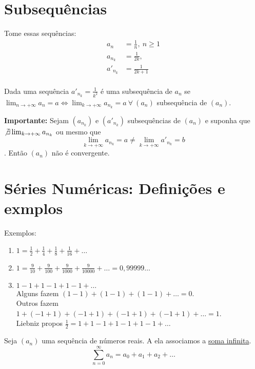 \documentclass[12pt,openany, letterpaper]{book}
\begin{document}
\section{Subsequências}
\label{sec:s24}
\hspace{5mm} Tome essas sequências:
\begin{align*}
a_n &= \frac{1}{n}, \ n \geq 1 \\
a_{n_k} &= \frac{1}{2k}, \\
a'_{n_k} &= \frac{1}{2k+1} \\
\end{align*}

Dada uma sequência $\displaystyle{a'_{n_k} = \frac{1}{k^2}}$ é uma subsequência de $a_n$ se $\displaystyle{\lim_{n \rightarrow +\infty} a_n = a \Longleftrightarrow \lim_{k \rightarrow +\infty} a_{n_k} = a} \ \forall \ (a_n)$ subsequência de $(a_n)$.

\textbf{Importante: }Sejam $(a_{n_k})$ e $(a'_{n_k})$ subsequências de $(a_n)$ e suponha que $\not \exists \lim_{k \rightarrow +\infty} a_{n_k}$ ou mesmo que $$\lim_{k \rightarrow +\infty} a_{n_k} = a \neq \lim_{k \rightarrow +\infty} a'_{n_k} = b $$. Então $(a_n)$ não é convergente.

\section{Séries Numéricas: Definições e exmplos}
\label{sec:s25}
\hspace{5mm} Exemplos:
\begin{enumerate}
\item $\displaystyle{1 = \frac{1}{2} + \frac{1}{4} + \frac{1}{8} + \frac{1}{16} + \hdots}$ \label{ex:251}
\item $\displaystyle{1 = \frac{9}{10} + \frac{9}{100} + \frac{9}{1000} + \frac{9}{10000} + \hdots = 0,99999 \hdots} $ \label{ex:252}
\item $\displaystyle{1 -1 + 1 - 1 + 1 - 1 + \hdots} $ \label{ex:253} \\
Alguns fazem $(1-1) + (1-1) + (1-1) + \hdots = 0$. \\ Outros fazem $1 + (-1 + 1) + (-1 + 1) + (-1 + 1) + (-1 + 1) + \hdots = 1$. \\ Liebniz propos $\frac{1}{2} = 1 + 1 - 1 + 1 - 1 + 1 - 1 + \hdots$ \\
\end{enumerate}

Seja $(a_n)$ uma sequência  de números reais. A ela associamos a \underline{soma infinita}. $$\sum_{n = 0}^{\infty} a_n = a_0 + a_1 + a_2 + \hdots$$
\end{document}
